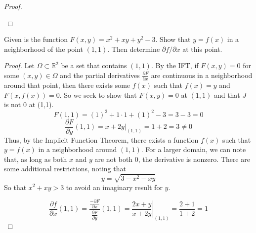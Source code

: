 \documentclass[12pt]{article}
\newcommand{\R}{\mathbb{R}}
\newenvironment{problem}[2][Problem]{\begin{trivlist}
\item[\hskip \labelsep {\bfseries #1}\hskip \labelsep {\bfseries #2.}]}{\end{trivlist}}
\begin{document}
\begin{proof}
\begin{enumerate}
\end{enumerate}
\end{proof}

\begin{problem}{D1}
Given is the function $F(x,y)=x^2+xy+y^2-3.$ Show that $y=f(x)$ in a neighborhood of the point $(1,1)$. Then determine $\partial f/\partial x$ at this point.
\end{problem}

\begin{proof}
Let $\Omega\subset\R^2$ be a set that contains $(1,1)$. By the IFT, if $F(x,y)=0$ for some $(x,y)\in\Omega$ and the partial derivatives $\frac{\partial F}{\partial x}$ are continuous in a neighborhood around that point, then there exists some $f(x)$ such that $f(x)=y$ and $F(x,f(x))=0$. So we seek to show that $F(x,y)=0$ at $(1,1)$ and that $J$ is not $0$ at (1,1). 
    \[F(1,1)=(1)^2+1\cdot1+(1)^2-3=3-3=0\]
    \[\frac{\partial F}{\partial y}(1,1) = \left.x+2y\right|_{(1,1)}=1+2=3\not=0\]
Thus, by the Implicit Function Theorem, there exists a function $f(x)$ such that $y=f(x)$ in a neighborhood around $(1,1)$. For a larger domain, we can note that, as long as both $x$ and $y$ are not both $0$, the derivative is nonzero. There are some additional restrictions, noting that 
\[y=\sqrt{3-x^2-xy}\]
So that $x^2+xy>3$ to avoid an imaginary result for $y$.

\[\frac{\partial f}{\partial x}(1,1)=\frac{\frac{-\partial F}{\partial x}}{\frac{\partial F}{\partial y}}(1,1)=\left.\frac{2x+y}{x+2y}\right|_{(1,1)}=\frac{2+1}{1+2}=1\]
\end{proof}


    \begin{comment}
    f1x1\frac{1+x_2+x_3}{(1+x_1+x_2+x_3)^2} f1x2\frac{-x_1}{(1+x_1+x_2+x_3)^2} f1x3\frac{-x_1}{(1+x_1+x_2+x_3)^2}
    f2x1\frac{-x_2}{(1+x_1+x_2+x_3)^2} f2x2\frac{1+x_1+x_3}{(1+x_1+x_2+x_3)^2} f2x3\frac{-x_2}{(1+x_1+x_2+x_3)^2}
    f3x1\frac{-x_3}{(1+x_1+x_2+x_3)^2} f3x2\frac{-x_3}{(1+x_1+x_2+x_3)^2} f3x3\frac{1+x_1+x_2}{(1+x_1+x_2+x_3)^2}
    \end{comment}

\begin{comment}
\begin{problem}{x.yz}
Statement of problem goes here
\end{problem}
 
\begin{proof}
Proof goes here. Repeat as needed
\end{proof}
\end{comment}
\end{document}
